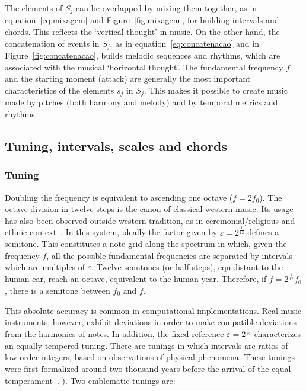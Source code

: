 The elements of $S_j$ can be overlapped by mixing them together, as in
equation~\ref{eq:mixagem} and Figure~\ref{fig:mixagem}, for building intervals and chords. This reflects the `vertical thought' in music. On the other hand, the concatenation of events
in $S_j$, as in equation~\ref{eq:concatenacao} and in Figure~\ref{fig:concatenacao}, builds melodic sequences and rhythms, which are associated with the musical `horizontal thought'. The fundamental frequency $f$ and the starting moment
(attack) are generally the most important characteristics of the elements $s_j$ in $S_j$. This makes it possible to create music made by pitches (both harmony and melody) and by temporal metrics and rhythms.

\subsection{Tuning, intervals, scales and chords}\label{subsec:afinacao}

\subsubsection{Tuning}

Doubling the frequency is equivalent to ascending one octave ($f=2f_0$). The octave division in twelve steps is the canon of classical western music. Its usage has also been observed
outside western tradition, as in ceremonial/religious and ethnic context~\cite{Wisnick}. In this system, ideally the factor given by $\varepsilon=2^{\frac{1}{12}}$ defines a semitone. This constitutes a note grid along the spectrum in which, given the frequency $f$, all the possible fundamental frequencies are separated by intervals which are multiples of $\varepsilon$. Twelve semitones (or half steps), equidistant to the human ear, reach an
octave, equivalent to the human year. Therefore, if $f=2^{\frac{1}{12}}f_0$, there is a semitone between
$f_0$ and $f$.

This absolute accuracy is common in computational implementations. Real music instruments, however, exhibit deviations in order to make compatible deviations from the harmonics of notes. In addition, the fixed reference $\varepsilon=2^{\frac{1}{12}}$ characterizes an equally tempered tuning. There are tunings in which intervals are ratios of low-order integers, based on observations of physical phenomena. These tunings were first formalized around two thousand years before the arrival of the equal temperament~\cite{Roederer}.
). Two emblematic tunings are:

